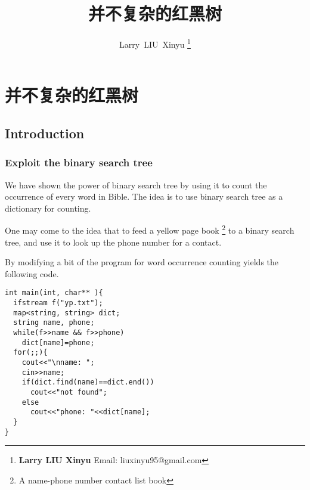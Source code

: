 \documentclass{article}
\begin{document}


\title{并不复杂的红黑树}

\author{Larry~LIU~Xinyu
\thanks{{\bfseries Larry LIU Xinyu } \newline
  Email: liuxinyu95@gmail.com \newline}
  }

\maketitle
\fi


\ifx\wholebook\relax
\chapter{并不复杂的红黑树}
\fi

\section{Introduction}
\label{introduction} 

\subsection{Exploit the binary search tree}
We have shown the power of binary search tree by using it to count
the occurrence of every word in Bible. The idea is to use binary
search tree as a dictionary for counting.

One may come to the idea that to feed a yellow page book
\footnote{A name-phone number contact list book} to a binary
search tree, and use it to look up the phone number for a contact.

By modifying a bit of the program for word occurrence counting
yields the following code.

\begin{lstlisting}
int main(int, char** ){
  ifstream f("yp.txt");
  map<string, string> dict;
  string name, phone;
  while(f>>name && f>>phone)
    dict[name]=phone;
  for(;;){
    cout<<"\nname: ";
    cin>>name;
    if(dict.find(name)==dict.end())
      cout<<"not found";
    else
      cout<<"phone: "<<dict[name];
  }
}
\end{lstlisting}
\end{document}
